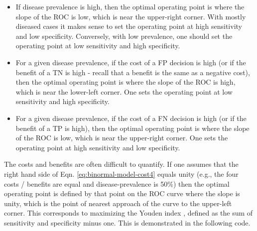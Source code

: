 \documentclass[
]{book}
\begin{document}
\begin{itemize}
\item
  If disease prevalence is high, then the optimal operating point is where the slope of the ROC is low, which is near the upper-right corner. With mostly diseased cases it makes sense to set the operating point at high sensitivity and low specificity. Conversely, with low prevalence, one should set the operating point at low sensitivity and high specificity.
\item
  For a given disease prevalence, if the cost of a FP decision is high (or if the benefit of a TN is high - recall that a benefit is the same as a negative cost), then the optimal operating point is where the slope of the ROC is high, which is near the lower-left corner. One sets the operating point at low sensitivity and high specificity.
\item
  For a given disease prevalence, if the cost of a FN decision is high (or if the benefit of a TP is high), then the optimal operating point is where the slope of the ROC is low, which is near the upper-right corner. One sets the operating point at high sensitivity and low specificity.
\end{itemize}

The costs and benefits are often difficult to quantify. If one assumes that the right hand side of Eqn. \eqref{eq:binormal-model-cost4} equals unity (e.g., the four costs / benefits are equal and disease-prevalence is 50\%) then the optimal operating point is defined by that point on the ROC curve where the slope is unity, which is the point of nearest approach of the curve to the upper-left corner. This corresponds to maximizing the Youden index \citep{youden1950index}, defined as the sum of sensitivity and specificity minus one. This is demonstrated in the following code.
\end{document}
